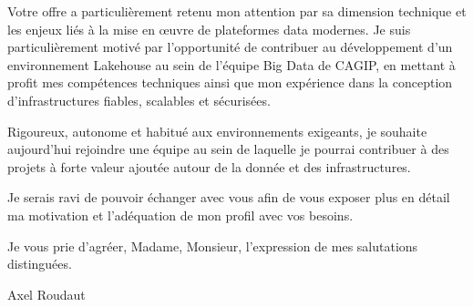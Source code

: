 \documentclass{article}
\begin{document}

Votre offre a particulièrement retenu mon attention par sa dimension technique et les enjeux liés à la mise en œuvre de plateformes data modernes. Je suis particulièrement motivé par l’opportunité de contribuer au développement d’un environnement Lakehouse au sein de l’équipe Big Data de CAGIP, en mettant à profit mes compétences techniques ainsi que mon expérience dans la conception d’infrastructures fiables, scalables et sécurisées. %

Rigoureux, autonome et habitué aux environnements exigeants, je souhaite aujourd’hui rejoindre une équipe au sein de laquelle je pourrai contribuer à des projets à forte valeur ajoutée autour de la donnée et des infrastructures. %

Je serais ravi de pouvoir échanger avec vous afin de vous exposer plus en détail ma motivation et l’adéquation de mon profil avec vos besoins.

\bigskip %

Je vous prie d’agréer, Madame, Monsieur, l’expression de mes salutations distinguées.

\vspace{50pt} %

Axel Roudaut
\end{document}
